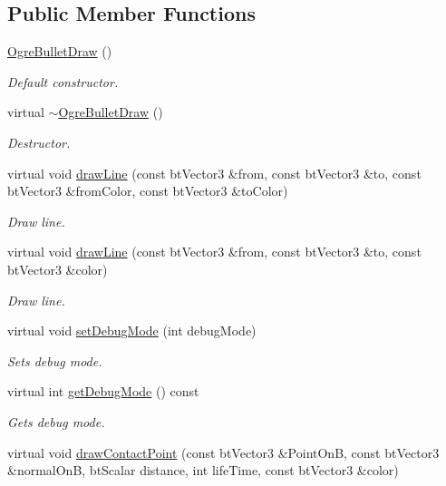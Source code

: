 \subsection*{Public Member Functions}
\begin{DoxyCompactItemize}
\item 
\hyperlink{class_ogre_bullet_draw_a9c4103fcc420fe9b69cb9d74f8e8e547}{Ogre\-Bullet\-Draw} ()
\begin{DoxyCompactList}\small\item\em Default constructor. \end{DoxyCompactList}\item 
virtual \hyperlink{class_ogre_bullet_draw_acf45d6e54ea76ce26bca1cd8db4afb9f}{$\sim$\-Ogre\-Bullet\-Draw} ()
\begin{DoxyCompactList}\small\item\em Destructor. \end{DoxyCompactList}\item 
virtual void \hyperlink{class_ogre_bullet_draw_a98ce833b82367cfa3233d47d9350995b}{draw\-Line} (const bt\-Vector3 \&from, const bt\-Vector3 \&to, const bt\-Vector3 \&from\-Color, const bt\-Vector3 \&to\-Color)
\begin{DoxyCompactList}\small\item\em Draw line. \end{DoxyCompactList}\item 
virtual void \hyperlink{class_ogre_bullet_draw_ae4a737c479e71935dbd5483763adc299}{draw\-Line} (const bt\-Vector3 \&from, const bt\-Vector3 \&to, const bt\-Vector3 \&color)
\begin{DoxyCompactList}\small\item\em Draw line. \end{DoxyCompactList}\item 
virtual void \hyperlink{class_ogre_bullet_draw_a9be5e64d3202665bb137bbc234457b82}{set\-Debug\-Mode} (int debug\-Mode)
\begin{DoxyCompactList}\small\item\em Sets debug mode. \end{DoxyCompactList}\item 
virtual int \hyperlink{class_ogre_bullet_draw_a7929d3ac3b12030aef451c1c996069c4}{get\-Debug\-Mode} () const 
\begin{DoxyCompactList}\small\item\em Gets debug mode. \end{DoxyCompactList}\item 
virtual void \hyperlink{class_ogre_bullet_draw_add7c437d446cd65f00c600f70707deff}{draw\-Contact\-Point} (const bt\-Vector3 \&Point\-On\-B, const bt\-Vector3 \&normal\-On\-B, bt\-Scalar distance, int life\-Time, const bt\-Vector3 \&color)

\end{DoxyCompactItemize}

